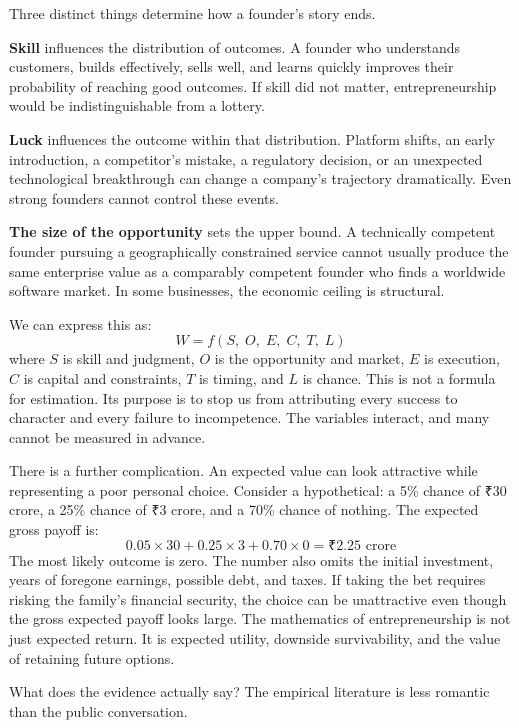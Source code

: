 Three distinct things determine how a founder's story ends.

\textbf{Skill} influences the distribution of outcomes. A founder who understands customers, builds effectively, sells well, and learns quickly improves their probability of reaching good outcomes. If skill did not matter, entrepreneurship would be indistinguishable from a lottery.

\textbf{Luck} influences the outcome within that distribution. Platform shifts, an early introduction, a competitor's mistake, a regulatory decision, or an unexpected technological breakthrough can change a company's trajectory dramatically. Even strong founders cannot control these events.

\textbf{The size of the opportunity} sets the upper bound. A technically competent founder pursuing a geographically constrained service cannot usually produce the same enterprise value as a comparably competent founder who finds a worldwide software market. In some businesses, the economic ceiling is structural.

We can express this as:
\[W = f(S,\; O,\; E,\; C,\; T,\; L)\]
where $S$ is skill and judgment, $O$ is the opportunity and market, $E$ is execution, $C$ is capital and constraints, $T$ is timing, and $L$ is chance. This is not a formula for estimation. Its purpose is to stop us from attributing every success to character and every failure to incompetence. The variables interact, and many cannot be measured in advance.

There is a further complication. An expected value can look attractive while representing a poor personal choice. Consider a hypothetical: a 5\% chance of \mbox{₹}30 crore, a 25\% chance of \mbox{₹}3 crore, and a 70\% chance of nothing. The expected gross payoff is:
\[0.05 \times 30 + 0.25 \times 3 + 0.70 \times 0 = \mbox{₹}2.25\text{ crore}\]
The most likely outcome is zero. The number also omits the initial investment, years of foregone earnings, possible debt, and taxes. If taking the bet requires risking the family's financial security, the choice can be unattractive even though the gross expected payoff looks large. The mathematics of entrepreneurship is not just expected return. It is expected utility, downside survivability, and the value of retaining future options.

What does the evidence actually say? The empirical literature is less romantic than the public conversation.

